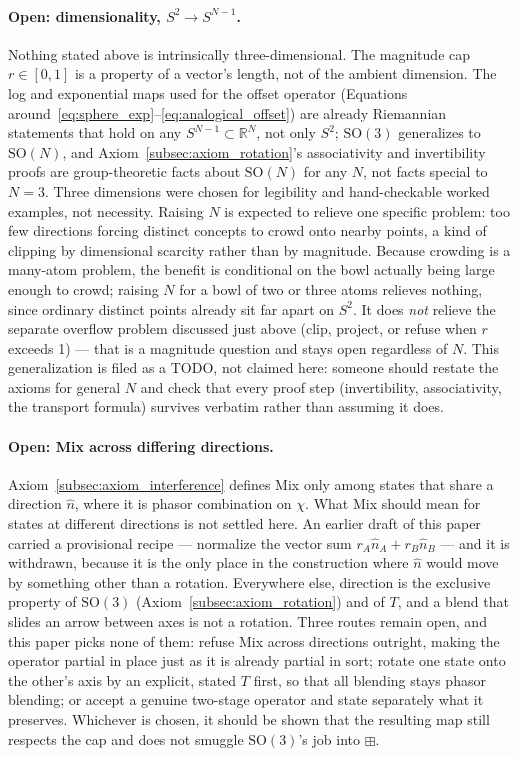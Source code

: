 \documentclass[12pt, a4paper]{article}
\begin{document}
\paragraph{Open: dimensionality, $S^2 \to S^{N-1}$.}
\label{subsec:dimensionality_open}
Nothing stated
above is intrinsically three-dimensional. The magnitude cap
$r\in[0,1]$ is a property of a vector's length, not of the ambient
dimension. The log and exponential maps used for the offset operator
(Equations around~\eqref{eq:sphere_exp}--\eqref{eq:analogical_offset})
are already Riemannian statements that hold on any $S^{N-1}\subset
\mathbb{R}^N$, not only $S^2$; $\mathrm{SO}(3)$ generalizes to
$\mathrm{SO}(N)$, and Axiom~\ref{subsec:axiom_rotation}'s
associativity and invertibility proofs are group-theoretic facts
about $\mathrm{SO}(N)$ for any $N$, not facts special to $N=3$. Three
dimensions were chosen for legibility and hand-checkable worked
examples, not necessity. Raising $N$ is expected to relieve one
specific problem: too few directions forcing distinct concepts to
crowd onto nearby points, a kind of clipping by dimensional scarcity
rather than by magnitude. Because crowding is a many-atom problem, the
benefit is conditional on the bowl actually being large enough to
crowd; raising $N$ for a bowl of two or three atoms relieves nothing,
since ordinary distinct points already sit far apart on $S^2$. It does
\emph{not} relieve the separate
overflow problem discussed just above (clip, project, or refuse when
$r$ exceeds 1) --- that is a magnitude question and stays open
regardless of $N$. This generalization is filed as a TODO, not
claimed here: someone should restate the axioms for general $N$ and
check that every proof step (invertibility, associativity, the
transport formula) survives verbatim rather than assuming it does.

\paragraph{Open: Mix across differing directions.}
\label{subsec:mix_scattered_open}
Axiom~\ref{subsec:axiom_interference} defines Mix only among states
that share a direction $\hat n$, where it is phasor combination on
$\chi$. What Mix should mean for states at different directions is not
settled here. An earlier draft of this paper carried a provisional
recipe --- normalize the vector sum $r_A\hat n_A+r_B\hat n_B$ --- and
it is withdrawn, because it is the only place in the construction
where $\hat n$ would move by something other than a rotation.
Everywhere else, direction is the exclusive property of
$\mathrm{SO}(3)$ (Axiom~\ref{subsec:axiom_rotation}) and of $T$, and a
blend that slides an arrow between axes is not a rotation. Three
routes remain open, and this paper picks none of them: refuse Mix
across directions outright, making the operator partial in place just
as it is already partial in sort; rotate one state onto the other's
axis by an explicit, stated $T$ first, so that all blending stays
phasor blending; or accept a genuine two-stage operator and state
separately what it preserves. Whichever is chosen, it should be shown
that the resulting map still respects the cap and does not smuggle
$\mathrm{SO}(3)$'s job into $\boxplus$.
\end{document}
